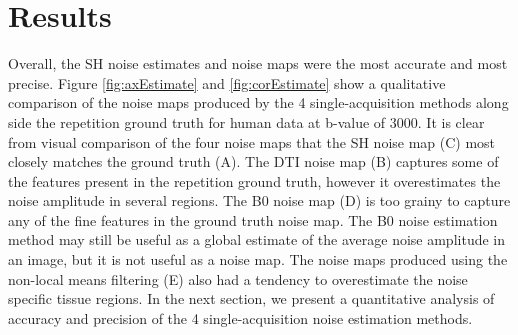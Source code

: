 \section{Results}

Overall, the SH noise estimates and noise maps were the most accurate
and most precise. Figure \ref{fig:axEstimate} and \ref{fig:corEstimate} show a qualitative comparison of the
noise maps produced by the 4 single-acquisition methods along side the
repetition ground truth for human data at b-value of 3000. It is clear
from visual comparison of the four noise maps that the SH noise map (C)
most closely matches the ground truth (A). The DTI noise map (B)
captures some of the features present in the repetition ground truth,
however it overestimates the noise amplitude in several regions. The B0
noise map (D) is too grainy to capture any of the fine features in the
ground truth noise map. The B0 noise estimation method may still be
useful as a global estimate of the average noise amplitude in an image,
but it is not useful as a noise map. The noise maps produced using the
non-local means filtering (E) also had a tendency to overestimate the
noise specific tissue regions. In the next section, we present a
quantitative analysis of accuracy and precision of the 4
single-acquisition noise estimation methods.
